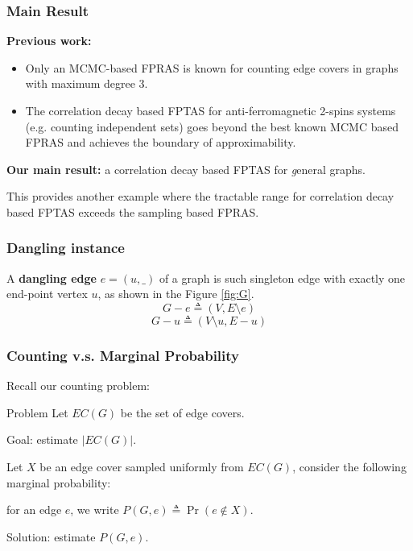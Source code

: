 \documentclass[mathserif]{beamer}
\newcommand{\abs}[1]{\left\vert#1\right\vert}
\begin{document}
\begin{frame}
	\frametitle{Main Result}
	{\bf Previous work:}
	\begin{itemize}
		\item Only an MCMC-based FPRAS is known for counting edge covers in graphs with maximum degree $3$.
		\item The correlation decay based FPTAS for anti-ferromagnetic 2-spins systems (e.g. counting independent sets) goes beyond the best known MCMC based FPRAS and achieves the boundary of approximability.
	\end{itemize}

	\pause
	{\bf Our main result:} a correlation decay based FPTAS for {\emph general} graphs.
 
 This provides another example where the tractable range for correlation decay based FPTAS exceeds the sampling based FPRAS.
\end{frame}

\begin{frame}
	\frametitle{Dangling instance} %

\begin{definition}
	A {\bf dangling edge} $e=(u,\_)$ of a graph is such singleton edge with exactly one end-point vertex $u$, as shown in the Figure \ref{fig:G}.
\[ G - e \triangleq \left(V, E \setminus e\right) \]
\[ G - u \triangleq \left(V \setminus u, E - u\right) \]
\end{definition}

\end{frame}

\begin{frame}
	\frametitle{Counting v.s. Marginal Probability}
	Recall our counting problem:
	\begin{block}{Problem}
	Let $EC(G)$ be the set of edge covers.

	Goal: estimate $\abs{EC(G)}$.
	\end{block}
	
	\pause
	Let $X$ be an edge cover sampled uniformly from $EC(G)$, consider the following marginal probability:

	for an edge $e$, we write $P(G,e) \triangleq \Pr ( e \notin X)$.

	\bigskip

	Solution: estimate $P(G,e)$.
\end{frame}
\end{document}
